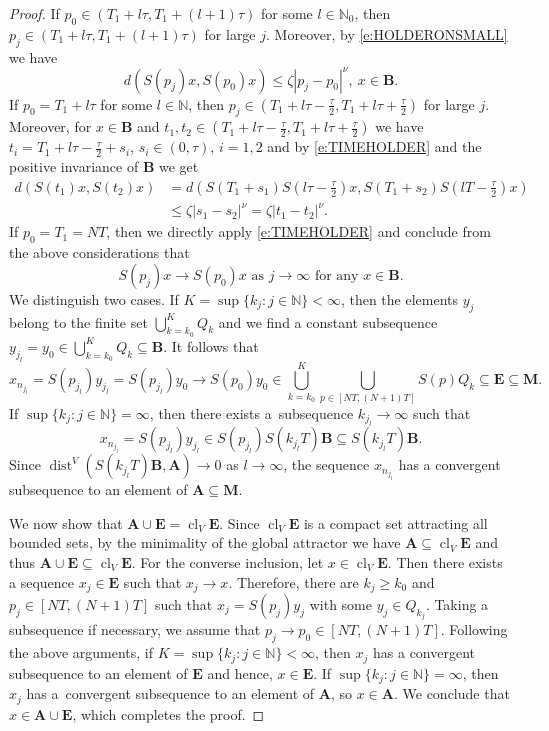 \documentclass[10pt,a4paper]{amsart}
\newcommand{\N}{\mathbb{N}}
\newcommand{\abs}[1]{\left\vert#1\right\vert}
\newcommand{\cl}{\operatorname{cl}}
\newcommand{\dist}{\operatorname{dist}}
\renewcommand{\geq}{\geqslant}
\renewcommand{\leq}{\leqslant}
\begin{document}
\begin{proof}
If $p_0\in(T_1+l\tau,T_1+(l+1)\tau)$ for some $l\in\N_0$, then $p_j\in(T_1+l\tau,T_1+(l+1)\tau)$
for large $j$. Moreover, by \eqref{e:HOLDERONSMALL} we have
$$d(S(p_j)x,S(p_0)x)\leq\zeta\abs{p_j-p_0}^{\nu},\ x\in\mathbf{B}.$$
If $p_0=T_1+l\tau$ for some $l\in\N$, then $p_j\in(T_1+l\tau-\frac{\tau}{2},T_1+l\tau+\frac{\tau}{2})$
for large $j$. Moreover, for $x\in\mathbf{B}$ and $t_1,t_2\in(T_1+l\tau-\frac{\tau}{2},T_1+l\tau+\frac{\tau}{2})$
we have $t_i=T_1+l\tau-\frac{\tau}{2}+s_i$, $s_i\in(0,\tau)$, $i=1,2$ and by \eqref{e:TIMEHOLDER}
and the positive invariance of $\mathbf{B}$ we get
\begin{equation*}
\begin{split}
d(S(t_1)x,S(t_2)x)&=d(S(T_1+s_1)S(l\tau-\tfrac{\tau}{2})x,S(T_1+s_2)S(lT-\tfrac{\tau}{2})x)\\
&\leq\zeta\abs{s_1-s_2}^{\nu}=\zeta\abs{t_1-t_2}^{\nu}.
\end{split}
\end{equation*}
If $p_0=T_1=NT$, then we directly apply \eqref{e:TIMEHOLDER} and conclude from
the above considerations that
\begin{equation*}
S(p_j)x\to S(p_0)x\text{ as }j\to\infty\text{ for any }x\in\mathbf{B}.
\end{equation*}
We distinguish two cases.
If $K=\sup\{k_j\colon j\in\N\}<\infty$, then the elements $y_j$ belong to the finite set $\bigcup_{k=k_0}^{K}Q_k$
and we find a constant subsequence $y_{j_l}=y_0\in\bigcup_{k=k_0}^{K}Q_k\subseteq\mathbf{B}$.
It follows that 
$$x_{n_{j_l}}=S(p_{j_l})y_{j_l}=S(p_{j_l})y_0\to S(p_0)y_0\in\bigcup_{k=k_0}^{K}\bigcup_{p\in[NT,(N+1)T]}S(p)Q_k\subseteq\mathbf{E}\subseteq\mathbf{M}.$$
If $\sup\{k_j\colon j\in\N\}=\infty$, then there exists a~subsequence $k_{j_l}\to\infty$ such that
$$x_{n_{j_l}}=S(p_{j_l})y_{j_l}\in S(p_{j_l})S(k_{j_l}T)\mathbf{B}\subseteq S(k_{j_l}T)\mathbf{B}.$$
Since $\dist^{V}(S(k_{j_l}T)\mathbf{B},\mathbf{A})\to 0$ as $l\to\infty$, the sequence $x_{n_{j_l}}$
has a convergent subsequence to an element of $\mathbf{A}\subseteq\mathbf{M}$.

We now show that $\mathbf{A}\cup\mathbf{E}=\cl_{V}\mathbf{E}$.
Since $\cl_{V}\mathbf{E}$ is a compact set attracting all bounded sets, by
the minimality of the global attractor we have $\mathbf{A}\subseteq\cl_{V}\mathbf{E}$ and thus $\mathbf{A}\cup\mathbf{E}\subseteq\cl_{V}\mathbf{E}$.
For the converse inclusion, let $x\in\cl_{V}\mathbf{E}$. Then there exists a sequence
$x_j\in\mathbf{E}$ such that $x_j\to x$. Therefore, there are $k_j\geq k_0$
and $p_j\in[NT,(N+1)T]$ such that $x_j=S(p_j)y_j$ with some $y_j\in Q_{k_j}$.
Taking a subsequence if necessary, we assume that $p_j\to p_0\in[NT,(N+1)T]$.
Following the above arguments, if $K=\sup\{k_j\colon j\in\N\}<\infty$, then
$x_j$ has a convergent subsequence to an element of $\mathbf{E}$ and hence,  $x\in\mathbf{E}$.
If $\sup\{k_j\colon j\in\N\}=\infty$, then $x_j$ has a~convergent subsequence to an element
of $\mathbf{A}$, so $x\in\mathbf{A}$. We conclude that $x\in\mathbf{A}\cup\mathbf{E}$,
which completes the proof.
\end{proof}
\end{document}
